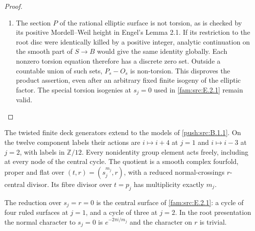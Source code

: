 \begin{proof}
\begin{enumerate}[label=\arabic*.,leftmargin=*]
\item The section $P$ of the rational elliptic surface is not
torsion, as is checked by its positive Mordell--Weil height
in Engel's Lemma 2.1. If its restriction to the root disc
were identically killed by a positive integer, analytic
continuation on the smooth part of $S\to B$ would give the
same identity globally. Each nonzero torsion equation
therefore has a discrete zero set. Outside a countable union
of such sets, $P_s-O_s$ is non-torsion. This disproves the
product assertion, even after an arbitrary fixed finite
isogeny of the elliptic factor. The special torsion
isogenies at $s_j=0$ used in \cref{fam:src:E.2.1} remain valid.
\end{enumerate}
\end{proof}

\begin{theorem}\label{push:src:B.1.2}\label{push:B12}

The twisted finite deck generators extend to the models of
\ref{push:src:B.1.1}. On the twelve component labels their actions are
$i\mapsto i+4$ at $j=1$ and $i\mapsto i-3$ at $j=2$,
with labels in $\mathbb Z/12$. Every nonidentity group
element acts freely, including at every node of the central
cycle. The quotient is a smooth complex fourfold, proper
and flat over $(t,r)=(s_j^{m_j},r)$, with a reduced
normal-crossings $r$-central divisor. Its fibre divisor
over $t=p_j$ has multiplicity exactly $m_j$.

The reduction over $s_j=r=0$ is the central surface of \cref{fam:src:E.2.1}:
a cycle of four ruled surfaces at $j=1$, and a cycle of
three at $j=2$. In the root presentation the normal
character to $s_j=0$ is $e^{-2\pi i/m_j}$ and the
character on $r$ is trivial.
\end{theorem}


